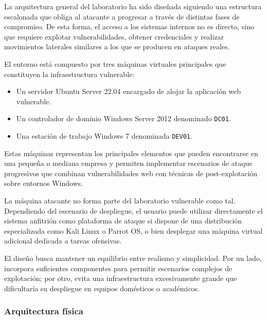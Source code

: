 La arquitectura general del laboratorio ha sido diseñada siguiendo una estructura escalonada que obliga al atacante a progresar a través de distintas fases de compromiso. De esta forma, el acceso a los sistemas internos no es directo, sino que requiere explotar vulnerabilidades, obtener credenciales y realizar movimientos laterales similares a los que se producen en ataques reales.

El entorno está compuesto por tres máquinas virtuales principales que  constituyen la infraestructura vulnerable:

\begin{itemize}
    \item Un servidor Ubuntu Server 22.04 encargado de alojar la aplicación web
          vulnerable.
    \item Un controlador de dominio Windows Server 2012 denominado \texttt{DC01}.
    \item Una estación de trabajo Windows 7 denominada \texttt{DEV01}.
\end{itemize}

Estas máquinas representan los principales elementos que pueden encontrarse en una pequeña o mediana empresa y permiten implementar escenarios de ataque progresivos que combinan vulnerabilidades web con técnicas de post-explotación sobre entornos Windows.

La máquina atacante no forma parte del laboratorio vulnerable como tal. Dependiendo del escenario de despliegue, el usuario puede utilizar directamente el sistema anfitrión como plataforma de ataque si dispone de una distribución especializada como Kali Linux o Parrot OS, o bien desplegar una máquina virtual adicional dedicada a tareas ofensivas.

El diseño busca mantener un equilibrio entre realismo y simplicidad. Por un lado, incorpora suficientes componentes para permitir escenarios complejos de explotación; por otro, evita una infraestructura excesivamente grande que dificultaría su despliegue en equipos domésticos o académicos.


\subsubsection{Arquitectura física}


